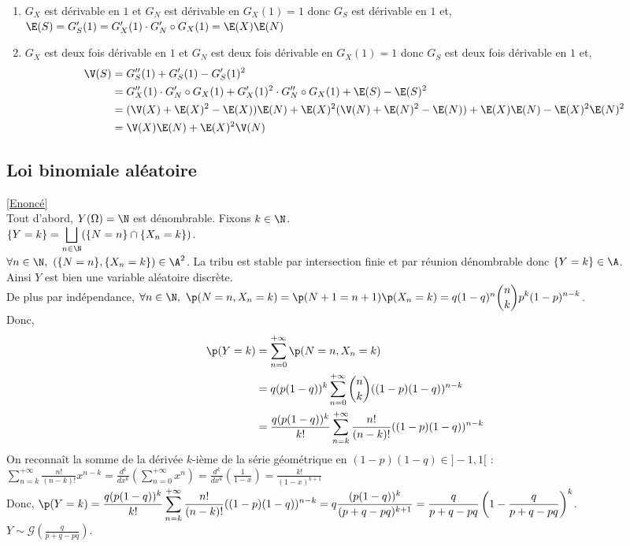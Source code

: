 \documentclass[8pt]{book}
\begin{document}
\begin{enumerate}
		Ainsi, $G_S(t)=\displaystyle\sum\limits_{p=1}^{+\infty}\p(N=p)G_X(t)^p=G_N\circ G_X(t)$.
		\item $G_X$ est dérivable en $1$ et $G_N$ est dérivable en $G_X(1)=1$ donc $G_S$ est dérivable en $1$ et,\\
		$\E(S)=G_S'(1)=G_X'(1)\cdot G_N'\circ G_X(1)=\E(X)\E(N)$
		\item $G_X$ est deux fois dérivable en $1$ et $G_N$ est deux fois dérivable en $G_X(1)=1$ donc $G_S$ est deux fois dérivable en $1$ et,
		\begin{align*}
			\V(S)&=G_S''(1)+G_S'(1)-G_S'(1)^2\\
			&=G_X''(1)\cdot G_N'\circ G_X(1)+G_X'(1)^2\cdot G_N''\circ G_X(1)+\E(S)-\E(S)^2\\
			&=(\V(X)+\E(X)^2-\E(X))\E(N)+\E(X)^2(\V(N)+\E(N)^2-\E(N))+\E(X)\E(N)-\E(X)^2\E(N)^2\\
			&=\V(X)\E(N)+\E(X)^2\V(N)
		\end{align*}
	\end{enumerate}
	
	\subsection{Loi binomiale aléatoire }
	\label{Loi binomiale aléatoire corrigé}
		\textcolor{blue}{\hyperref[Loi binomiale aléatoire]{[Enoncé]}}\\
	Tout d'abord, $Y(\Omega)=\N$ est dénombrable. Fixons $k\in \N$.\\
	$\{Y=k\}=\displaystyle\bigsqcup\limits_{n\in \N}(\{N=n\}\cap\{X_n=k\})$.\\
	$\forall n\in \N,\ (\{N=n\},\{X_n=k\})\in \A^2$. La tribu est stable par intersection finie et par réunion dénombrable donc $\{Y=k\}\in \A$.\\
	Ainsi $Y$ est bien une variable aléatoire discrète.\\
	De plus par indépendance, $\forall n\in \N,\ \p(N=n,X_n=k)=\p(N+1=n+1)\p(X_n=k)=q(1-q)^n\displaystyle\binom{n}{k}p^k(1-p)^{n-k}$.\\
	Donc,
	\begin{align*}
		\p(Y=k)&=\sum\limits_{n=0}^{+\infty}\p(N=n,X_n=k)\\
		&=q(p(1-q))^k\sum\limits_{n=0}^{+\infty}\binom{n}{k}((1-p)(1-q))^{n-k}\\
		&=\frac{q(p(1-q))^k}{k!}\sum\limits_{n=k}^{+\infty}\frac{n!}{(n-k)!}((1-p)(1-q))^{n-k}
	\end{align*}
	On reconnaît la somme de la dérivée $k$-ième de la série géométrique en $(1-p)(1-q)\in ]-1,1[$ :\\
	$\displaystyle\sum\limits_{n=k}^{+\infty}\frac{n!}{(n-k)!}x^{n-k}=\frac{d^k}{dx^k}\left(\sum\limits_{n=0}^{+\infty}x^n\right)=\frac{d^k}{dx^k}\left(\frac{1}{1-x}\right)=\frac{k!}{(1-x)^{k+1}}$\\
	Donc, $\p(Y=k)=\displaystyle\frac{q(p(1-q))^k}{k!}\sum\limits_{n=k}^{+\infty}\frac{n!}{(n-k)!}((1-p)(1-q))^{n-k}=q\frac{(p(1-q))^k}{(p+q-pq)^{k+1}}=\frac{q}{p+q-pq}\left(1-\frac{q}{p+q-pq}\right)^k$.\\
	$Y\sim \mathcal{G}\left(\displaystyle\frac{q}{p+q-pq}\right)$.
	
\end{document}
